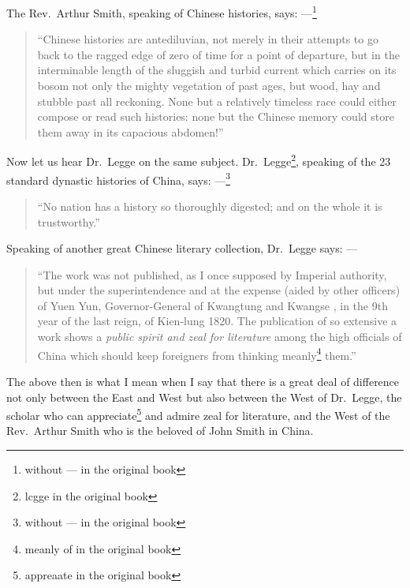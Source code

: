The Rev.~Arthur Smith, speaking of Chinese histories, says: ---\footnote{without --- in the original book}
\begin{quote} \footnotesize
``Chinese histories are antediluvian, not merely in their attempts to go back to the ragged edge of zero of time for a point of departure, but in the interminable length of the sluggish and turbid current which carries on its bosom not only the mighty vegetation of past ages, but wood, hay and stubble past all reckoning. None but a relatively timeless race could either compose or read such histories: none but the Chinese memory could store them away in its capacious abdomen!''
\end{quote}
Now let us hear Dr.~Legge on the same subject.
Dr.~Legge\footnote{lcgge in the original book}, speaking of the 23 standard dynastic histories of China, says: ---\footnote{without --- in the original book}
\begin{quote} \footnotesize
``No nation has a history so thoroughly digested; and on the whole it is trustworthy.''
\end{quote}
Speaking of another great Chinese literary collection, Dr.~Legge says: --- 
\begin{quote} \footnotesize
``The work was not published, as I once supposed by Imperial authority, but under the superintendence and at the expense (aided by other officers) of Yuen Yun,  Governor-General of Kwangtung  and Kwangse , in the 9th year of the last reign, of Kien-lung 1820. 
The publication of so extensive a work shows a \emph{public spirit and zeal for literature} among the high officials of China which should keep foreigners from thinking meanly\footnote{meanly of in the original book} them.''
\end{quote}

The above then is what I mean when I say that there is a great deal of difference not only between the East and West but also between the West of Dr.~Legge, the scholar who can appreciate\footnote{appreaate in the original book} and admire zeal for literature, and the West of the Rev.~Arthur Smith who is the beloved of John Smith in China.
